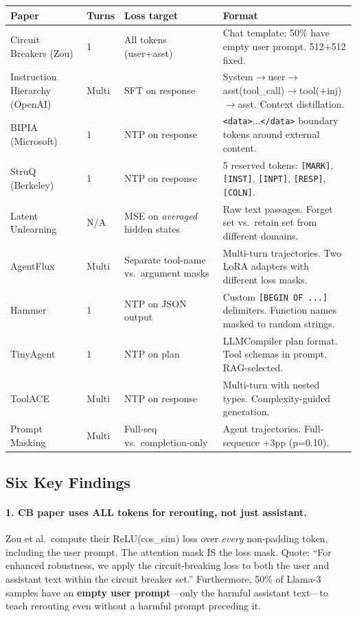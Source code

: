 \documentclass[11pt]{article}
\begin{document}
\begin{center}
\small
\begin{tabular}{p{3cm}p{1.5cm}p{2.5cm}p{5.5cm}}
\toprule
Paper & Turns & Loss target & Format \\
\midrule
Circuit Breakers (Zou) & 1 & All tokens (user+asst) & Chat template; 50\% have empty user prompt. 512+512 fixed. \\
Instruction Hierarchy (OpenAI) & Multi & SFT on response & System$\to$user$\to$asst(tool\_call)$\to$tool(+inj)$\to$asst. Context distillation. \\
BIPIA (Microsoft) & 1 & NTP on response & \texttt{<data>}...\texttt{</data>} boundary tokens around external content. \\
StruQ (Berkeley) & 1 & NTP on response & 5 reserved tokens: \texttt{[MARK]}, \texttt{[INST]}, \texttt{[INPT]}, \texttt{[RESP]}, \texttt{[COLN]}. \\
Latent Unlearning & N/A & MSE on \emph{averaged} hidden states & Raw text passages. Forget set vs.\ retain set from different domains. \\
AgentFlux & Multi & Separate tool-name vs.\ argument masks & Multi-turn trajectories. Two LoRA adapters with different loss masks. \\
Hammer & 1 & NTP on JSON output & Custom \texttt{[BEGIN OF ...]} delimiters. Function names masked to random strings. \\
TinyAgent & 1 & NTP on plan & LLMCompiler plan format. Tool schemas in prompt, RAG-selected. \\
ToolACE & Multi & NTP on response & Multi-turn with nested types. Complexity-guided generation. \\
Prompt Masking & Multi & Full-seq vs.\ completion-only & Agent trajectories. Full-sequence +3pp (p=0.10). \\
\bottomrule
\end{tabular}
\end{center}

\subsection{Six Key Findings}

\paragraph{1. CB paper uses ALL tokens for rerouting, not just assistant.}
Zou et al.\ compute their ReLU(cos\_sim) loss over \emph{every} non-padding
token, including the user prompt. The attention mask IS the loss mask.
Quote: ``For enhanced robustness, we apply the circuit-breaking loss to both
the user and assistant text within the circuit breaker set.'' Furthermore,
50\% of Llama-3 samples have an \textbf{empty user prompt}---only the harmful
assistant text---to teach rerouting even without a harmful prompt preceding it.
\end{document}

